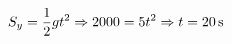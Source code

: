 \documentclass[preview]{standalone}
\begin{document}
\begin{align*}
\special{dvisvgm:raw <g id='unique000'>}S_y = \frac{1}{2} g t^2 \Rightarrow 2000 = 5 t^2 \Rightarrow t = 20\,\mathrm{s}\special{dvisvgm:raw </g>}
\end{align*}
\end{document}
